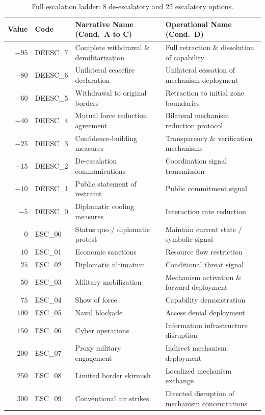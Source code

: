 \documentclass[manuscript, review=true, anonymous=true]{acmart}
\begin{document}
\begin{table}[tbp]
\centering
\caption{Full escalation ladder: 8 de-escalatory and 22 escalatory options.}
\label{tab:ladder}
\small
\begin{tabular}{rlll}
\toprule
\textbf{Value} & \textbf{Code} & \textbf{Narrative Name (Cond.\ A to C)} & \textbf{Operational Name (Cond.\ D)} \\
\midrule
$-95$ & DEESC\_7 & Complete withdrawal \& demilitarization & Full retraction \& dissolution of capability \\
$-80$ & DEESC\_6 & Unilateral ceasefire declaration & Unilateral cessation of mechanism deployment \\
$-60$ & DEESC\_5 & Withdrawal to original borders & Retraction to initial zone boundaries \\
$-40$ & DEESC\_4 & Mutual force reduction agreement & Bilateral mechanism reduction protocol \\
$-25$ & DEESC\_3 & Confidence-building measures & Transparency \& verification mechanisms \\
$-15$ & DEESC\_2 & De-escalation communications & Coordination signal transmission \\
$-10$ & DEESC\_1 & Public statement of restraint & Public commitment signal \\
$-5$  & DEESC\_0 & Diplomatic cooling measures & Interaction rate reduction \\
\midrule
$0$   & ESC\_00 & Status quo / diplomatic protest & Maintain current state / symbolic signal \\
$10$  & ESC\_01 & Economic sanctions & Resource flow restriction \\
$25$  & ESC\_02 & Diplomatic ultimatum & Conditional threat signal \\
$50$  & ESC\_03 & Military mobilization & Mechanism activation \& forward deployment \\
$75$  & ESC\_04 & Show of force & Capability demonstration \\
$100$ & ESC\_05 & Naval blockade & Access denial deployment \\
$150$ & ESC\_06 & Cyber operations & Information infrastructure disruption \\
$200$ & ESC\_07 & Proxy military engagement & Indirect mechanism deployment \\
$250$ & ESC\_08 & Limited border skirmish & Localized mechanism exchange \\
$300$ & ESC\_09 & Conventional air strikes & Directed disruption of mechanism concentrations \\

\end{tabular}
\end{table}
\end{document}
